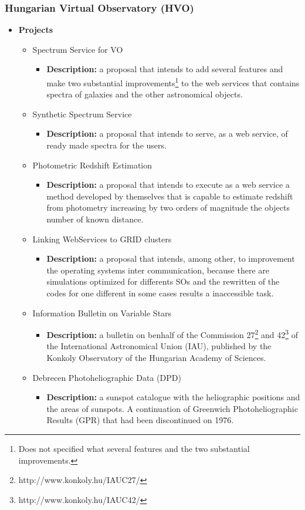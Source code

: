 \subsubsection{Hungarian Virtual Observatory (HVO)}
\begin{itemize}
\item \textbf{Projects}
\begin{itemize}
\item Spectrum Service for VO
\begin{itemize}
\item \textbf{Description:} a proposal that intends to add several features and
make two substantial improvements\footnote{Does not specified what several
features and the two substantial improvements.} to the web services that
contains spectra of galaxies and the other astronomical objects. 
\end{itemize}
\item Synthetic Spectrum Service
\begin{itemize}
\item \textbf{Description:} a proposal that intends to serve, as a web service,
of ready made spectra for the users.
\end{itemize}
\item Photometric Redshift Estimation
\begin{itemize}
\item \textbf{Description:} a proposal that intends to execute as a web service
a method developed by themselves that is capable to estimate redshift from
photometry increasing by two orders of magnitude the objects number of known
distance. 
\end{itemize}
\item Linking WebServices to GRID clusters
\begin{itemize}
\item \textbf{Description:} a proposal that intends, among other, to improvement
the operating systems inter communication, because there are simulations
optimized for differents SOs and the rewritten of the codes for one different in
some cases results a inaccessible task.
\end{itemize}
\item Information Bulletin on Variable Stars
\begin{itemize}
\item \textbf{Description:} a bulletin on benhalf of the Commission
27\footnote{http://www.konkoly.hu/IAUC27/} and
42\footnote{http://www.konkoly.hu/IAUC42/} of the International Astronomical
Union (IAU), published by the Konkoly Observatory of the Hungarian Academy of
Sciences. 
\end{itemize}
\item Debrecen Photoheliographic Data (DPD)
\begin{itemize}
\item \textbf{Description:} a sunspot catalogue with the heliographic positions
and the areas of sunspots. A continuation of Greenwich Photoheliographic
Results (GPR) that had been discontinued on 1976.
\end{itemize}
\end{itemize}
\end{itemize}

